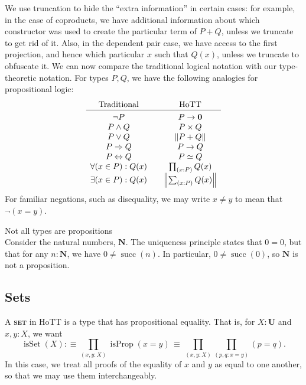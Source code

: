 \documentclass{article}
\newcommand{\defn}[1]{{\scshape\bfseries\color{MPBemph}#1}}
\newcommand{\eql}{\mathbin{:\equiv}}
\newcommand{\U}{\mathbf{U}}
\newcommand{\tpi}[1]{\prod_{(#1)}}
\newcommand{\tsigma}[1]{\sum_{(#1)}}
\newcommand{\1}{\textbf{1}}
\newcommand{\0}{\mathbf{0}}
\newcommand{\2}{\textbf{2}}
\newcommand{\N}{\textbf{N}}
\renewcommand{\succ}{\operatorname{succ}}
\newcommand{\norm}[1][\cdot]{\left\|#1\right\|}
\DeclareMathOperator{\isProp}{isProp}
\DeclareMathOperator{\isSet}{isSet}
\begin{document}
We use truncation to hide the ``extra information'' in certain cases: for example, in the case of coproducts, we have additional information about which constructor was used to create the particular term of \( P + Q \), unless we truncate to get rid of it. Also, in the dependent pair case, we have access to the first projection, and hence which particular \( x \) such that \( Q(x) \), unless we truncate to obfuscate it.
We can now compare the traditional logical notation with our type-theoretic notation. For types \( P, Q \), we have the following analogies for propositional logic:
\[ \begin{array}{ccc}
	\text{Traditional} && \text{HoTT} \\ \hline \\[-9pt]
	\neg P && P \to \0 \\
	P \wedge Q && P \times Q \\
	P \vee Q && \norm[P + Q] \\
	P \Rightarrow Q && P \to Q \\
	P \Leftrightarrow Q && P \simeq Q \\
	\forall (x \in P) : Q(x) && \tpi{x : P} Q(x) \\
	\exists (x \in P) : Q(x) && \norm[\tsigma{x : P} Q(x)]
\end{array} \]
For familiar negations, such as disequality, we may write \( x \neq y \) to mean that \( \neg(x = y) \).
\begin{example}{Not all types are propositions}{} \\[3pt]
	Consider the natural numbers, \( \N \). The uniqueness principle states that \( 0 = 0 \), but that for any \( n : \N \), we have \( 0 \neq \succ(n) \). In particular, \( 0 \neq \succ(0) \), so \( \N \) is not a proposition.
\end{example}
\subsection{Sets}
A \defn{set} in HoTT is a type that has propositional equality. That is, for \( X : \U \) and \( x, y : X \), we want
\[ \isSet(X) \eql \tpi{x, y : X} \isProp(x = y) \,\equiv\, \tpi{x, y : X} \tpi{p, q : x = y} (p = q). \]
In this case, we treat all proofs of the equality of \( x \) and \( y \) as equal to one another, so that we may use them interchangeably.
\end{document}
